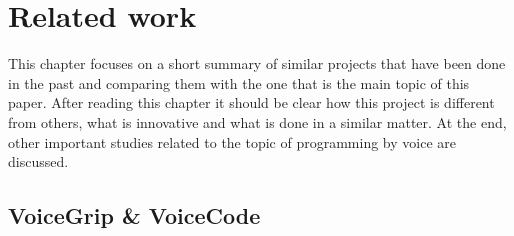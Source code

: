 \chapter{Related work}
\label{cha:RelatedWork}

This chapter focuses on a short summary of similar projects that have been done in the past and comparing them with the one that is the main topic of this paper. After reading this chapter it should be clear how this project is different from others, what is innovative and what is done in a similar matter. At the end, other important studies related to the topic of programming by voice are discussed. 

\section{VoiceGrip \& VoiceCode}

